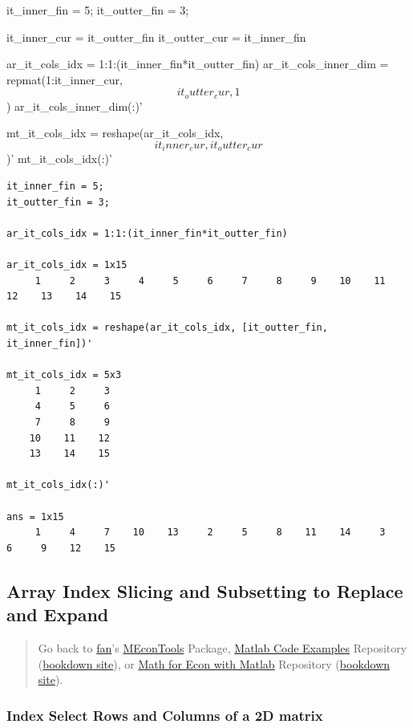 \documentclass[
]{book}
\begin{document}
it\_inner\_fin = 5; it\_outter\_fin = 3;

it\_inner\_cur = it\_outter\_fin it\_outter\_cur = it\_inner\_fin

ar\_it\_cols\_idx = 1:1:(it\_inner\_fin*it\_outter\_fin) ar\_it\_cols\_inner\_dim
= repmat(1:it\_inner\_cur, \[it_outter_cur, 1\]) ar\_it\_cols\_inner\_dim(:)'

mt\_it\_cols\_idx = reshape(ar\_it\_cols\_idx, \[it_inner_cur,
it_outter_cur\])' mt\_it\_cols\_idx(:)'

\begin{verbatim}
it_inner_fin = 5;
it_outter_fin = 3;

ar_it_cols_idx = 1:1:(it_inner_fin*it_outter_fin)

ar_it_cols_idx = 1x15    
     1     2     3     4     5     6     7     8     9    10    11    12    13    14    15

mt_it_cols_idx = reshape(ar_it_cols_idx, [it_outter_fin, it_inner_fin])'

mt_it_cols_idx = 5x3    
     1     2     3
     4     5     6
     7     8     9
    10    11    12
    13    14    15

mt_it_cols_idx(:)'

ans = 1x15    
     1     4     7    10    13     2     5     8    11    14     3     6     9    12    15
\end{verbatim}

\hypertarget{array-index-slicing-and-subsetting-to-replace-and-expand}{%
\subsection{Array Index Slicing and Subsetting to Replace and Expand}\label{array-index-slicing-and-subsetting-to-replace-and-expand}}

\begin{quote}
Go back to \href{http://fanwangecon.github.io/}{fan}'s \href{https://fanwangecon.github.io/MEconTools/}{MEconTools} Package, \href{https://fanwangecon.github.io/M4Econ/}{Matlab Code Examples} Repository (\href{https://fanwangecon.github.io/M4Econ/bookdown}{bookdown site}), or \href{https://fanwangecon.github.io/Math4Econ/}{Math for Econ with Matlab} Repository (\href{https://fanwangecon.github.io/Math4Econ/bookdown}{bookdown site}).
\end{quote}

\hypertarget{index-select-rows-and-columns-of-a-2d-matrix}{%
\subsubsection{Index Select Rows and Columns of a 2D matrix}\label{index-select-rows-and-columns-of-a-2d-matrix}}
\end{document}
